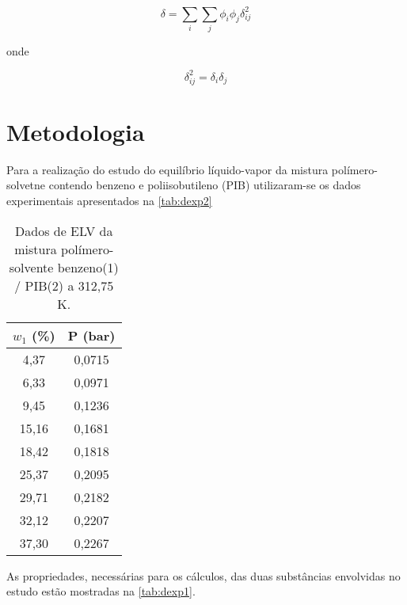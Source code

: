\begin{equation}\label{eq:delta}
\delta = \sum_i\sum_j\phi_i\phi_j\delta_{ij}^2
\end{equation}

onde

\begin{equation}\label{eq:deltaij}
\delta_{ij}^2 = \delta_i\delta_j
\end{equation}



\section{Metodologia}

Para a realização do estudo do equilíbrio líquido-vapor da mistura
polímero-solvetne contendo benzeno e poliisobutileno (PIB) utilizaram-se os
dados experimentais apresentados na \autoref{tab:dexp2}

\begin{table}[htb]
\renewcommand{\arraystretch}{1.3}
\centering
\caption{Dados de ELV da mistura polímero-solvente benzeno(1) / PIB(2) a 312,75
K.}
\begin{tabular}{S[table-format=2.2,round-mode=places,round-precision=2]
S[table-format=1.4,round-mode=places,round-precision=4]}
\toprule
{$w_1$ (\%)}	&	{P (bar)}	\\
\midrule

4,37	&	0,0715	\\
6,33	&	0,0971	\\
9,45	&	0,1236	\\
15,16	&	0,1681	\\
18,42	&	0,1818	\\
25,37	&	0,2095	\\
29,71	&	0,2182	\\
32,12	&	0,2207	\\
37,30	&	0,2267	\\
\bottomrule
\end{tabular}
\label{tab:dexp2}
\end{table}

As propriedades, necessárias para os cálculos, das duas substâncias
envolvidas no estudo estão mostradas na \autoref{tab:dexp1}.

